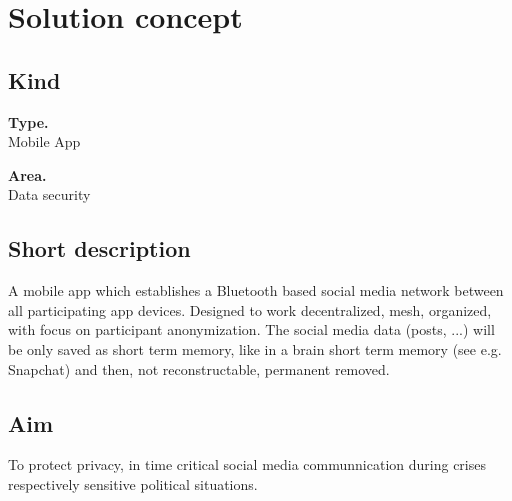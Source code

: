 \documentclass{article}
\newtheorem*{theorem A}{Theorem A}
\newtheorem*{theorem B}{N\"olker's Theorem}
\theoremstyle{remark}
\theoremstyle{remark}
\begin{document}
\section{Solution concept}
\label{s:solutionconcept}
\subsection{Kind}
\label{ss:kind}
\begin{flushleft}
    \textbf{Type.}\\
    Mobile App

    \vspace{0.3cm}
    \textbf{Area.}\\
    Data security
\end{flushleft}
\subsection{Short description}
\label{ss:shortdescription}
A mobile app which establishes a Bluetooth based social media network between all participating app devices. Designed to work decentralized, mesh, organized, with focus on participant anonymization. The social media data (posts, ...) will be only saved as short term memory, like in a brain short term memory (see e.g. Snapchat) and then, not reconstructable, permanent removed.
\subsection{Aim}
\label{ss:aim}
To protect privacy, in time critical social media communnication during crises respectively sensitive political situations.
\end{document}
